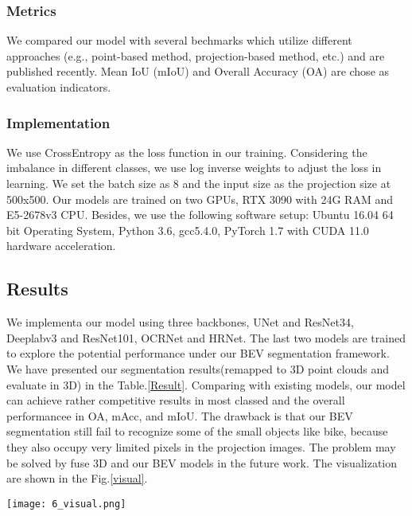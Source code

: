 \documentclass[conference]{IEEEtran}
\begin{document}
\subsubsection{Metrics}
We compared our model with several bechmarks \cite{Qi2017PointNetDL, Qi2017PointNetDH,Tatarchenko2018TangentCF,Landrieu2018LargeScalePC,Graham20183DSS,Thomas2019KPConvFA,Hu2020RandLANetES} which utilize different approaches (e.g., point-based method, projection-based method, etc.) and are published recently. Mean IoU (mIoU) and Overall Accuracy (OA) are chose as evaluation indicators.
\subsubsection{Implementation}
We use CrossEntropy as the loss function in our training. Considering the imbalance in different classes, we use log inverse weights to adjust the loss in learning. We set the batch size as 8 and the input size as the projection size at 500x500. Our models are trained on two GPUs, RTX 3090 with 24G RAM and E5-2678v3 CPU. Besides, we use the following software setup: Ubuntu 16.04 64 bit Operating System, Python 3.6, gcc5.4.0, PyTorch 1.7 with CUDA 11.0 hardware acceleration.

\subsection{Results}
We implementa our model using three backbones, UNet and ResNet34, Deeplabv3 and ResNet101, OCRNet and HRNet. The last two models are trained to explore the potential performance under our BEV segmentation framework. We have presented our segmentation results(remapped to 3D point clouds and evaluate in 3D) in the Table.\ref{Result}. Comparing with existing models, our model can achieve rather competitive results in most classed and the overall performancee in OA, mAcc, and mIoU. The drawback is that our BEV segmentation still fail to recognize some of the small objects like bike, because they also occupy very limited pixels in the projection images. The problem may be solved by fuse 3D and our BEV models in the future work. The visualization are shown in the Fig.\ref{visual}.

\begin{figure*}[t!]
\centering
\texttt{[image: 6\_visual.png]}
\caption{Visualization of BEV segmentation. From top to down are: RGB images, altitude images, labels(dark  means invalid area without points), and 2D segmentation outputs.}
\label{visual}
\end{figure*}
\end{document}
